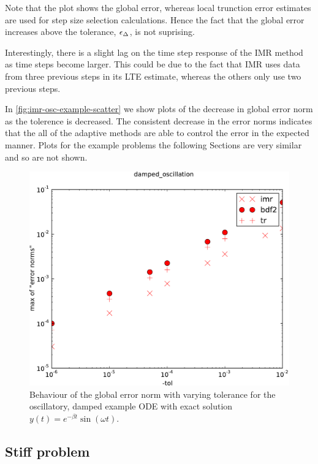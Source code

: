 Note that the plot shows the global error, whereas local trunction error estimates are used for step size selection calculations.
Hence the fact that the global error increases above the tolerance, $\epsilon_{\Delta_{}}$, is not suprising.

Interestingly, there is a slight lag on the time step response of the IMR method as time steps become larger.
This could be due to the fact that IMR uses data from three previous steps in its LTE estimate, whereas the others only use two previous steps.

In \autoref{fig:imr-osc-example-scatter} we show plots of the decrease in global error norm as the tolerence is decreased. 
The consistent decrease in the error norms indicates that the all of the adaptive methods are able to control the error in the expected manner.
Plots for the example problems the following Sections are very similar and so are not shown.

\begin{figure}[h!]
  \centering \includegraphics[width=1\textwidth]{aimr/damped_oscillation-maxoferrornormsvs-tol}
  \caption{Behaviour of the global error norm with varying tolerance for the oscillatory, damped example ODE with exact solution $y(t) = e^{-\beta t} \sin(\omega t)$.}
  \label{fig:imr-osc-example-scatter}
\end{figure}

\subsection{Stiff problem}
\label{sec:imr-stiff-example}


